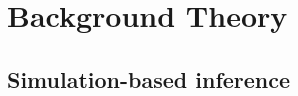 \section{Background Theory}
\label{sec:background_theory}

\subsection{Simulation-based inference}
\label{sec:background_theory_sbi}




